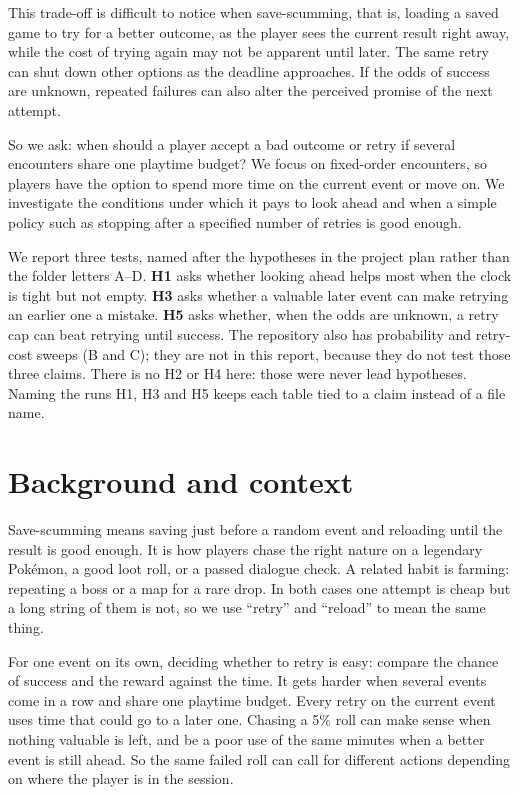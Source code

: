 \documentclass[11pt,a4paper]{article}
\newcommand{\who}[1]{}
\begin{document}
This trade-off is difficult to notice when save-scumming, that is, loading a saved game to try for a better outcome, as the player sees the current result right away, while the cost of trying again may not be apparent until later. The same retry can shut down other options as the deadline approaches. If the odds of success are unknown, repeated failures can also alter the perceived promise of the next attempt.

So we ask: when should a player accept a bad outcome or retry if several encounters share one playtime budget? We focus on fixed-order encounters, so players have the option to spend more time on the current event or move on. We investigate the conditions under which it pays to look ahead and when a simple policy such as stopping after a specified number of retries is good enough.

We report three tests, named after the hypotheses in the project plan rather than the folder letters A--D. \textbf{H1} asks whether looking ahead helps most when the clock is tight but not empty. \textbf{H3} asks whether a valuable later event can make retrying an earlier one a mistake. \textbf{H5} asks whether, when the odds are unknown, a retry cap can beat retrying until success. The repository also has probability and retry-cost sweeps (B and C); they are not in this report, because they do not test those three claims. There is no H2 or H4 here: those were never lead hypotheses. Naming the runs H1, H3 and H5 keeps each table tied to a claim instead of a file name.

\section{Background and context\who{Daniel}}
Save-scumming means saving just before a random event and reloading until the result is good enough. It is how players chase the right nature on a legendary Pok\'emon, a good loot roll, or a passed dialogue check. A related habit is farming: repeating a boss or a map for a rare drop. In both cases one attempt is cheap but a long string of them is not, so we use ``retry'' and ``reload'' to mean the same thing.

For one event on its own, deciding whether to retry is easy: compare the chance of success and the reward against the time. It gets harder when several events come in a row and share one playtime budget. Every retry on the current event uses time that could go to a later one. Chasing a 5\% roll can make sense when nothing valuable is left, and be a poor use of the same minutes when a better event is still ahead. So the same failed roll can call for different actions depending on where the player is in the session.
\end{document}

